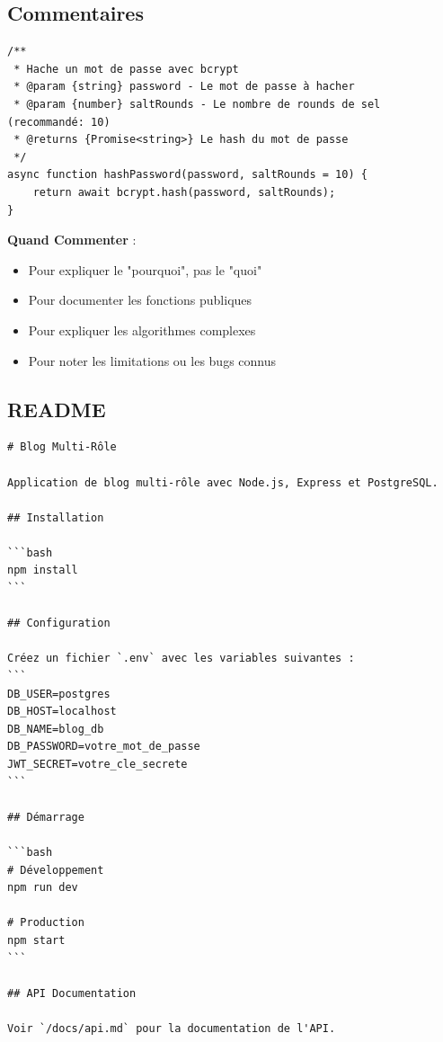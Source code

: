 \subsection{Commentaires}

\begin{lstlisting}[style=javascript, caption=Commentaires utiles]
/**
 * Hache un mot de passe avec bcrypt
 * @param {string} password - Le mot de passe à hacher
 * @param {number} saltRounds - Le nombre de rounds de sel (recommandé: 10)
 * @returns {Promise<string>} Le hash du mot de passe
 */
async function hashPassword(password, saltRounds = 10) {
    return await bcrypt.hash(password, saltRounds);
}
\end{lstlisting}

\begin{bestpracticebox}
    \textbf{Quand Commenter} :
    \begin{itemize}
        \item Pour expliquer le "pourquoi", pas le "quoi"
        \item Pour documenter les fonctions publiques
        \item Pour expliquer les algorithmes complexes
        \item Pour noter les limitations ou les bugs connus
    \end{itemize}
\end{bestpracticebox}

\subsection{README}

\begin{lstlisting}[style=markdown, caption=README.md]
# Blog Multi-Rôle

Application de blog multi-rôle avec Node.js, Express et PostgreSQL.

## Installation

```bash
npm install
```

## Configuration

Créez un fichier `.env` avec les variables suivantes :
```
DB_USER=postgres
DB_HOST=localhost
DB_NAME=blog_db
DB_PASSWORD=votre_mot_de_passe
JWT_SECRET=votre_cle_secrete
```

## Démarrage

```bash
# Développement
npm run dev

# Production
npm start
```

## API Documentation

Voir `/docs/api.md` pour la documentation de l'API.
\end{lstlisting}

